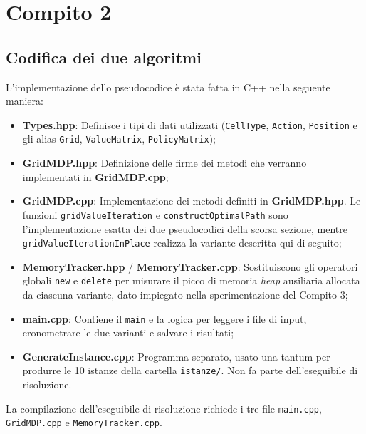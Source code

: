 \section{Compito 2}

\subsection{Codifica dei due algoritmi}
L'implementazione dello pseudocodice è stata fatta in C++ nella seguente maniera:
\begin{itemize}
    \item \textbf{Types.hpp}: Definisce i tipi di dati utilizzati (\texttt{CellType}, \texttt{Action}, \texttt{Position} e gli alias \texttt{Grid}, \texttt{ValueMatrix}, \texttt{PolicyMatrix});
    \item \textbf{GridMDP.hpp}: Definizione delle firme dei metodi che verranno implementati in \textbf{GridMDP.cpp};
    \item \textbf{GridMDP.cpp}: Implementazione dei metodi definiti in \textbf{GridMDP.hpp}. Le funzioni \texttt{gridValueIteration} e \texttt{constructOptimalPath} sono l'implementazione esatta dei due pseudocodici della scorsa sezione, mentre \texttt{gridValueIterationInPlace} realizza la variante descritta qui di seguito;
    \item \textbf{MemoryTracker.hpp} / \textbf{MemoryTracker.cpp}: Sostituiscono gli operatori globali \texttt{new} e \texttt{delete} per misurare il picco di memoria \textit{heap} ausiliaria allocata da ciascuna variante, dato impiegato nella sperimentazione del Compito 3;
    \item \textbf{main.cpp}: Contiene il \texttt{main} e la logica per leggere i file di input, cronometrare le due varianti e salvare i risultati;
    \item \textbf{GenerateInstance.cpp}: Programma separato, usato una tantum per produrre le 10 istanze della cartella \texttt{istanze/}. Non fa parte dell'eseguibile di risoluzione.
\end{itemize}

\noindent
La compilazione dell'eseguibile di risoluzione richiede i tre file \texttt{main.cpp}, \texttt{GridMDP.cpp} e \texttt{MemoryTracker.cpp}.

